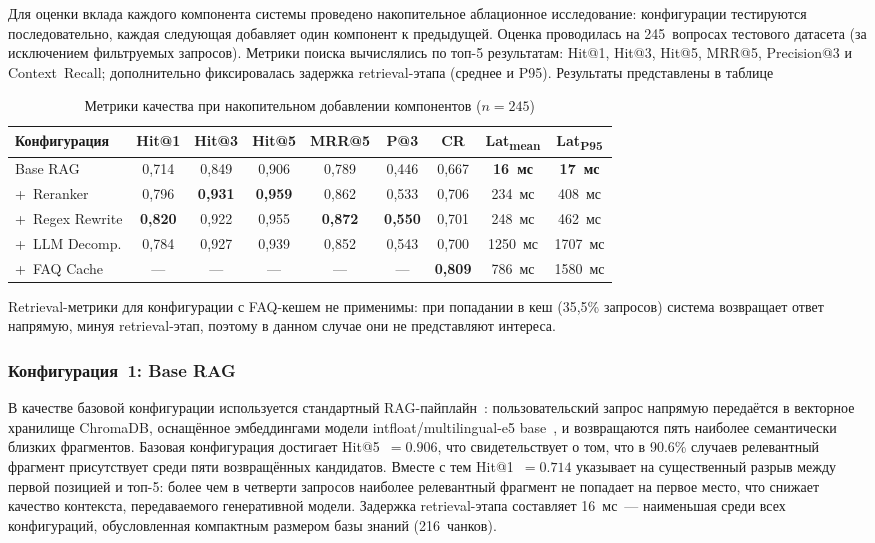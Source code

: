 \documentclass{article}
\begin{document}
Для оценки вклада каждого компонента системы проведено накопительное
аблационное исследование: конфигурации тестируются последовательно,
каждая следующая добавляет один компонент к предыдущей.
Оценка проводилась на 245~вопросах тестового датасета (за исключением
фильтруемых запросов).
Метрики поиска вычислялись по топ-5 результатам: Hit@1, Hit@3, Hit@5,
MRR@5, Precision@3 и Context~Recall; дополнительно фиксировалась
задержка retrieval-этапа (среднее и P95).
Результаты представлены в таблице
\begin{table}[h]
\centering
\caption{Метрики качества при накопительном добавлении компонентов ($n = 245$)}
\label{tab:ablation}
\small
\begin{tabular}{lcccccccc}
\hline
\textbf{Конфигурация}
  & \textbf{Hit@1}
  & \textbf{Hit@3}
  & \textbf{Hit@5}
  & \textbf{MRR@5}
  & \textbf{P@3}
  & \textbf{CR}
  & \textbf{Lat\textsubscript{mean}}
  & \textbf{Lat\textsubscript{P95}} \\
\hline
Base RAG
  & 0{,}714 & 0{,}849 & 0{,}906 & 0{,}789 & 0{,}446 & 0{,}667
  & \textbf{16~мс} & \textbf{17~мс} \\
{+~Reranker}
  & 0{,}796 & \textbf{0{,}931} & \textbf{0{,}959} & 0{,}862 & 0{,}533 & 0{,}706
  & 234~мс & 408~мс \\
{+~Regex Rewrite}
  & \textbf{0{,}820} & 0{,}922 & 0{,}955 & \textbf{0{,}872} & \textbf{0{,}550} & 0{,}701
  & 248~мс & 462~мс \\
{+~LLM Decomp.}
  & 0{,}784 & 0{,}927 & 0{,}939 & 0{,}852 & 0{,}543 & 0{,}700
  & 1250~мс & 1707~мс \\
{+~FAQ Cache}
  & {---} & {---} & {---} & {---} & {---} & \textbf{0{,}809}
  & 786~мс & 1580~мс \\
\hline
\end{tabular}

\smallskip
\raggedright
\footnotesize
\end{table}

\noindent Retrieval-метрики для конфигурации с FAQ-кешем не применимы:
при попадании в кеш (35{,}5\% запросов) система возвращает ответ
напрямую, минуя retrieval-этап, поэтому в данном случае они
не представляют интереса.

\subsubsection{Конфигурация~1: Base RAG}

В качестве базовой конфигурации используется стандартный RAG-пайплайн~\cite{1}: пользовательский запрос напрямую передаётся в векторное хранилище ChromaDB, оснащённое эмбеддингами модели intfloat/multilingual-e5 base~\cite{4}, и возвращаются пять наиболее семантически близких фрагментов. Базовая конфигурация достигает Hit@5~$= 0.906$, что свидетельствует о том, что в 90.6\% случаев релевантный фрагмент присутствует среди  пяти возвращённых кандидатов. Вместе с тем Hit@1~$= 0.714$ указывает на существенный разрыв между первой позицией и топ-5: более чем в четверти запросов наиболее релевантный фрагмент не попадает на первое место, что снижает качество контекста, передаваемого генеративной модели. Задержка retrieval-этапа составляет 16~мс~--- наименьшая среди всех конфигураций, обусловленная компактным размером базы знаний (216~чанков).
\end{document}
